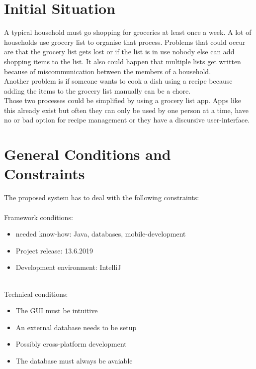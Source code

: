 \documentclass[12pt]{article}
\theoremstyle{definition}
\newenvironment{textblock}{%
   \setlength{\parindent}{0pt}
   \large
   
}{}
\begin{document}
\section{Initial Situation}

\begin{textblock}
A typical household must go shopping for groceries at least once a week. A lot of households use grocery list to organise that process. Problems that could occur are that the grocery list gets lost or if the list is in use nobody else can add shopping items to the list. It also could happen that multiple lists get written because of miscommunication between the members of a household. \\
Another problem is if someone wants to cook a dish using a recipe because adding the items to the grocery list manually can be a chore.\\
Those two processes could be simplified by using a grocery list app. Apps like this already exist but often they can only be used by one person at a time, have no or bad option for recipe management or they have a discursive user-interface.
\end{textblock}

\pagebreak

\section{General Conditions and Constraints}

\begin{textblock}
The proposed system has to deal with the following constraints: \\\\
Framework conditions:
\begin{itemize}
\item needed know-how: Java, databases, mobile-development
\item Project release: 13.6.2019
\item Development environment: IntelliJ \\\\
\end{itemize}

Technical conditions:
\begin{itemize}
\item The GUI must be intuitive
\item An external database needs to be setup
\item Possibly cross-platform development
\item The database must always be avaiable
\end{itemize}
\end{textblock}
\end{document}
